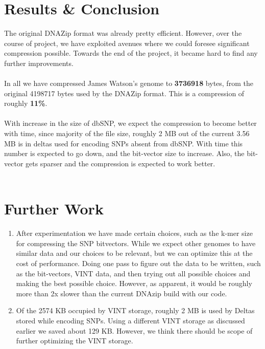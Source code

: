 \documentclass{article}
\begin{document}
\clearpage

\section {Results \& Conclusion}
The original DNAZip format was already pretty efficient. However, over the
course of project, we have exploited avenues where we could foresee significant
compression possible. Towards the end of the project, it became hard to find any
further improvements.\\
\\
In all we have compressed James Watson's genome to \textbf{3736918} bytes, from
the original 4198717 bytes used by the DNAZip format. This is a compression of
roughly \textbf{11\%}. \\
\\
With increase in the size of dbSNP, we expect the compression to become better
with time, since majority of the file size, roughly 2 MB out of the current 3.56
MB is in deltas used for encoding SNPs absent from dbSNP. With time this number
is expected to go down, and the bit-vector size to increase. Also, the
bit-vector gets sparser and the compression is expected to work better.\\
\\
\clearpage

\section {Further Work}

\begin{enumerate}
\item After experimentation we have made certain choices, such as the k-mer size
for compressing the SNP bitvectors. While we expect other genomes to have
similar data and our choices to be relevant, but we can optimize this at the
cost of performance. Doing one pass to figure out the data to be written, such
as the bit-vectors, VINT data, and then trying out all possible choices and
making the best possible choice. However, as apparent, it would be roughly more
than 2x slower than the current DNAzip build with our code.

\item Of the 2574 KB occupied by VINT storage, roughly 2 MB is used by Deltas
stored while encoding SNPs. Using a different VINT storage as discussed earlier
we saved about 129 KB. However, we think there should be scope of further
optimizing the VINT storage. 

\end{enumerate}
\end{document}
